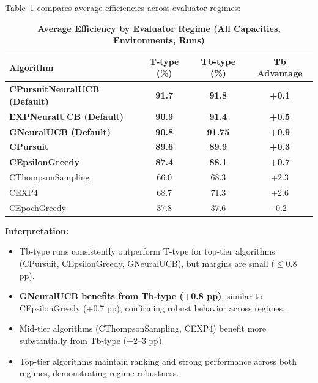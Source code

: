 \documentclass[12pt,a4paper]{article}
\newcommand{\performance}[1]{\textcolor{performancecolor}{\textbf{#1}}}
\newcommand{\legacy}[1]{\textcolor{legacycolor}{\textbf{#1}}}
\newcommand{\neural}[1]{\textcolor{neuralcolor}{\textbf{#1}}}
\begin{document}
Table~\ref{tab:regime-comparison} compares average efficiencies across evaluator regimes:

\begin{table}[H]
\centering
\caption{\performance{Average Efficiency by Evaluator Regime (All Capacities, Environments, Runs)}}
\label{tab:regime-comparison}
\begin{tabular}{|l|c|c|c|}
\hline
\textbf{Algorithm} & \textbf{T-type (\%)} & \textbf{Tb-type (\%)} & \textbf{Tb Advantage} \\
\hline
\hline
\neural{CPursuitNeuralUCB (Default)}   & \neural{91.7}     & \neural{91.8}     & \neural{+0.1} \\
\legacy{EXPNeuralUCB (Default)}        & \legacy{90.9}     & \legacy{91.4}     & \legacy{+0.5} \\
\neural{GNeuralUCB (Default)}          & \neural{90.8}     & \neural{91.75}    & \neural{+0.9} \\
\performance{CPursuit}                 & \performance{89.6} & \performance{89.9} & \performance{+0.3} \\
\performance{CEpsilonGreedy}           & \performance{87.4} & \performance{88.1} & \performance{+0.7} \\
CThompsonSampling                      & 66.0              & 68.3              & +2.3 \\
CEXP4                                  & 68.7              & 71.3              & +2.6 \\
CEpochGreedy                           & 37.8              & 37.6              & -0.2 \\
\hline
\end{tabular}
\end{table}

\textbf{Interpretation:}
\begin{itemize}
\item Tb-type runs consistently outperform T-type for top-tier algorithms (CPursuit, CEpsilonGreedy, GNeuralUCB), but margins are small ($\leq$0.8 pp).
\item \neural{GNeuralUCB benefits from Tb-type (+0.8 pp)}, similar to CEpsilonGreedy (+0.7 pp), confirming robust behavior across regimes.
\item Mid-tier algorithms (CThompsonSampling, CEXP4) benefit more substantially from Tb-type ($+2$--3 pp).
\item Top-tier algorithms maintain ranking and strong performance across both regimes, demonstrating regime robustness.
\end{itemize}
\end{document}
